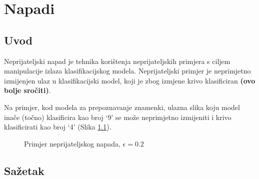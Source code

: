 \chapter{Napadi}

\newcommand{\norm}[1]{\left\|{#1}\right\|}

\section{Uvod}

Neprijateljski napad je tehnika korištenja neprijateljskih primjera s ciljem manipulacije izlaza klasifikacijskog modela. Neprijateljski primjer je neprimjetno izmijenjen ulaz u klasifikacijski model, koji je zbog izmjene krivo klasificiran \textbf{(ovo bolje sročiti)}.

Na primjer, kod modela za prepoznavanje znamenki, ulazna slika koju model inače (točno) klasificira kao broj ‘9’ se može neprimjetno izmijeniti i krivo klasificirati kao broj ‘4’ (Slika \ref{fig:example}).

\begin{figure}[H]
    \centering
    \qquad
    \caption{Primjer neprijateljskog napada, $\epsilon = 0.2$}%
    \label{fig:example}%
\end{figure}

\section{Sažetak} 

